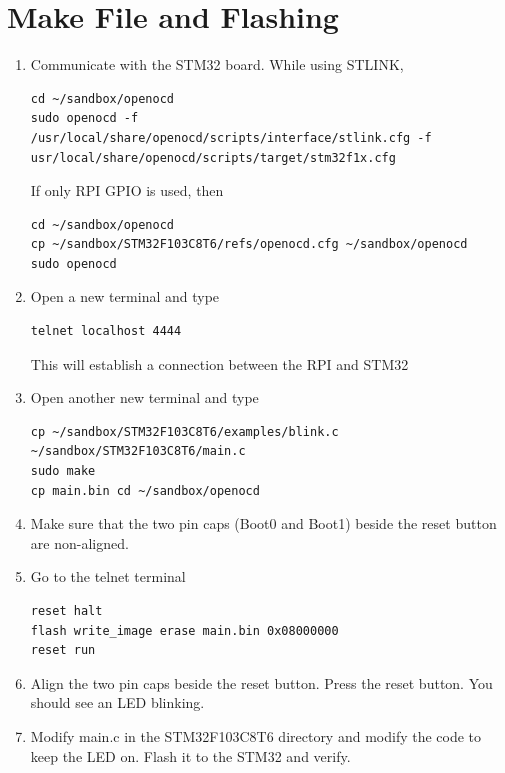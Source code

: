 \documentclass[journal,12pt,twocolumn]{IEEEtran}
\begin{document}
\section{Make File and Flashing}
\begin{enumerate}[1.]
\item Communicate with the STM32 board.  While using STLINK,
\begin{lstlisting}
cd ~/sandbox/openocd
sudo openocd -f /usr/local/share/openocd/scripts/interface/stlink.cfg -f usr/local/share/openocd/scripts/target/stm32f1x.cfg
\end{lstlisting}
If only RPI GPIO is used, then
\begin{lstlisting}
cd ~/sandbox/openocd
cp ~/sandbox/STM32F103C8T6/refs/openocd.cfg ~/sandbox/openocd
sudo openocd 
\end{lstlisting}
\item Open a new terminal and type
\begin{lstlisting}
telnet localhost 4444
\end{lstlisting}
This will establish a connection between the RPI and STM32
\item Open another new terminal and type
\begin{lstlisting}
cp ~/sandbox/STM32F103C8T6/examples/blink.c ~/sandbox/STM32F103C8T6/main.c
sudo make
cp main.bin cd ~/sandbox/openocd
\end{lstlisting}
\item Make sure that the two pin caps (Boot0 and Boot1) beside the reset button are non-aligned.
\item Go to the telnet terminal 
\begin{lstlisting}
reset halt
flash write_image erase main.bin 0x08000000
reset run
\end{lstlisting}
\item Align the two pin caps beside the reset button. Press the reset button.  You should see an LED blinking.
\item Modify main.c in the STM32F103C8T6 directory and modify the code to keep the LED on. Flash it to the STM32 and verify.
%
\end{enumerate}
\end{document}
